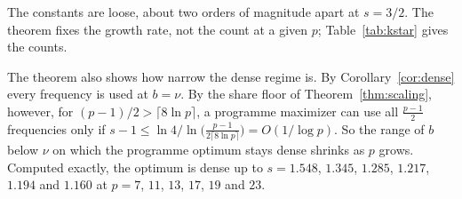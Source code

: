 The constants are loose, about two orders of magnitude apart at $s=3/2$. The theorem fixes the growth rate, not the count at a given $p$; Table~\ref{tab:kstar} gives the counts.

The theorem also shows how narrow the dense regime is. By Corollary~\ref{cor:dense} every frequency is used at $b=\nu$. By the share floor of Theorem~\ref{thm:scaling}, however, for $(p-1)/2>\lceil8\ln p\rceil$, a programme maximizer can use all $\frac{p-1}2$ frequencies only if $s-1\le\ln4/\ln\big(\frac{p-1}{2\lceil8\ln p\rceil}\big)=O(1/\log p)$. So the range of $b$ below $\nu$ on which the programme optimum stays dense shrinks as $p$ grows. Computed exactly, the optimum is dense up to $s=1.548$, $1.345$, $1.285$, $1.217$, $1.194$ and $1.160$ at $p=7$, $11$, $13$, $17$, $19$ and $23$.
